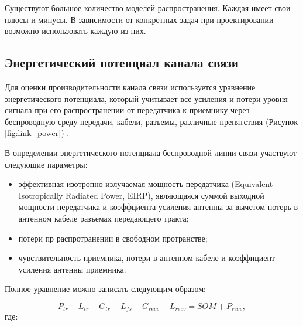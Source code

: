 Существуют большое количество моделей распространения. Каждая имеет свои плюсы и минусы. В зависимости от конкретных задач при проектировании возможно использовать каждую из них. 

\subsection{Энергетический потенциал канала связи}
Для оценки производительности канала связи используется уравнение энергетического потенциала, который учитывает все усиления и потери уровня сигнала при его распространении от передатчика к приемнику через беспроводную  среду передачи, кабели, разъемы, различные препятствия (Рисунок \cref{fig:link_power}) \cite{Proletarsky}.

В определении энергетического потенциала беспроводной линии связи участвуют следующие параметры:
\begin{itemize}
  \item эффективная изотропно-излучаемая мощность передатчика (Equivalent Isotropically Radiated Power, EIRP), являющаяся суммой выходной мощности передатчика и коэффциента усиления антенны за вычетом потерь в антенном кабеле разъемах передающего тракта;
  \item потери пр распротранении в свободном протранстве;
  \item чувствительность приемника, потери в антенном кабеле и коэффициент усиления антенны приемника.
\end{itemize}
Полное уравнение можно записать следующим образом:



\begin{equation}
  \label{eq:part3_link_budget}
  P_{tr} - L_{tr} + G_{tr} - L_{fs} + G_{recv} - L_{recv} = SOM + P_{recv},
\end{equation}
где:

